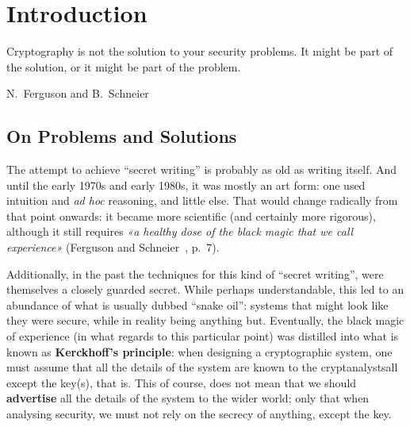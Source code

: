 
\chapter{Introduction}
\label{cha:intro}

\epigraph{Cryptography is not the solution to your security problems. It might be part of the solution, or it might be part of the problem.}{N.\ Ferguson and B.\ Schneier}


\section{On Problems and Solutions}
  \label{sec:prob_sol}
  The attempt to achieve ``secret writing'' is probably as old as writing itself. And until the early 1970s and early 1980s, it was mostly an art form: one used intuition and \emph{ad hoc} reasoning, and little else. That would change radically from that point onwards: it became more scientific (and certainly more rigorous), although it still requires \emph{«a healthy dose of the black magic that we call experience»} (Ferguson and Schneier~\cite{Ferguson:Schneier:PracC}, p.\ 7).

  Additionally, in the past the techniques for this kind of ``secret writing'', were themselves a closely guarded secret. While perhaps understandable, this led to an abundance of what is usually dubbed ``snake oil'': systems that might look like they were secure, while in reality being anything but. Eventually, the black magic of experience (in what regards to this particular point) was distilled into what is known as \textbf{Kerckhoff's principle}: when designing a cryptographic system, one must assume that all the details of the system are known to the cryptanalysts\emd all except the key(s), that is. This of course, does not mean that we should \textbf{advertise} all the details of the system to the wider world; only that when analysing security, we must not rely on the secrecy of anything, except the key.

